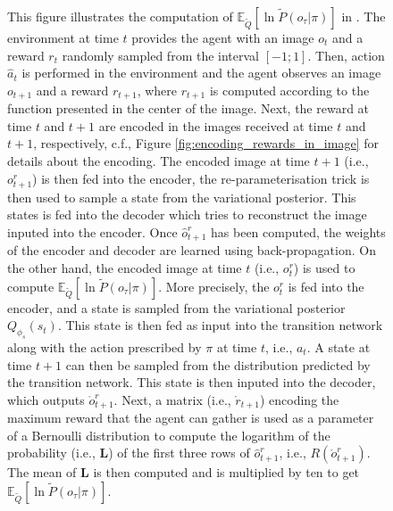 \documentclass[twoside,11pt]{article}
\let\oldmathcal\mathcal
\renewcommand{\mathcal}[1]{%
  \IfSubStr{ABCDEFGHIJKLMNOPQRSTUVWXYZ}{#1}{\oldmathcal{#1}}{\mathdutchcal{#1}}
}
\providecommand{\DIFadd}[1]{{\protect\color{blue}\uwave{#1}}} %
\providecommand{\DIFaddFL}[1]{\DIFadd{#1}} %
\providecommand{\DIFaddbeginFL}{} %
\providecommand{\DIFaddendFL}{} %
\begin{document}
\begin{figure}
\begin{center}
	\end{center}
  \caption{This figure illustrates the computation of $\mathbb{E}_{\tilde{Q}}[\ln \tilde{P}(o_\tau|\pi)]$ in \DIFaddbeginFL \DIFaddFL{(the code of) }\DIFaddendFL \citet{DeepAIwithMCMC}. The environment at time $t$ provides the agent with an image $o_t$ and a reward $r_t$ randomly sampled from the interval $[-1;1]$. Then, action $\hat{a}_t$ is performed in the environment and the agent observes an image $o_{t+1}$ and a reward $r_{t+1}$, where $r_{t+1}$ is computed according to the function presented in the center of the image. Next, the reward at time $t$ and $t+1$ are encoded in the images received at time $t$ and $t+1$, respectively, c.f., Figure \ref{fig:encoding_rewards_in_image} for details about the encoding. The encoded image at time $t+1$ (i.e., $o^r_{t+1}$) is then fed into the encoder, the re-parameterisation trick is then used to sample a state from the variational posterior. This states is fed into the decoder which tries to reconstruct the image inputed into the encoder. Once $\hat{o}^r_{t+1}$ has been computed, the weights of the encoder and decoder are learned using back-propagation. On the other hand, the encoded image at time $t$ (i.e., $o^r_t$) is used to compute $\mathbb{E}_{\tilde{Q}}[\ln \tilde{P}(o_\tau|\pi)]$. More precisely, the $o^r_t$ is fed into the encoder, and a state is sampled from the variational posterior $Q_{\phi_s}(s_t)$. This state is then fed as input into the transition network along with the action prescribed by $\pi$ at time $t$, i.e., $a_t$. A state at time $t+1$ can then be sampled from the distribution predicted by the transition network. This state is then inputed into the decoder, which outputs $\mathring{o}^r_{t+1}$. Next, a matrix (i.e., $\mathring{r}_{t+1}$) encoding the maximum reward that the agent can gather is used as a parameter of a Bernoulli distribution to compute the logarithm of the probability (i.e., $\bm{L}$) of the first three rows of $\hat{o}^r_{t+1}$, i.e., $R(\mathring{o}^r_{t+1})$. The mean of $\bm{L}$ is then computed and is multiplied by ten to get $\mathbb{E}_{\tilde{Q}}[\ln \tilde{P}(o_\tau|\pi)]$.}
   \label{fig:computation_of_extrinsic_value}
\end{figure}
\end{document}
